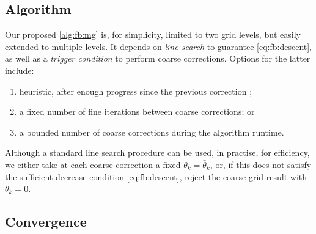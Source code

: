 \documentclass[a4paper,english]{jnsao}
\theoremstyle{definition}
\numberwithin{algorithm}{section}
\begin{document}
\subsection{Algorithm}
\label{sec:full-algorithm}

Our proposed \cref{alg:fb:mg} is, for simplicity, limited to two grid levels, but easily extended to multiple levels.
It depends on \emph{line search} to guarantee \eqref{eq:fb:descent}, as well as a \emph{trigger condition} to perform coarse corrections. Options for the latter include:
\begin{enumerate}[nosep]
    \item heuristic, after enough progress since the previous correction \cite{parpas2017multilevel};
    \item a fixed number of fine iterations between coarse corrections; or
    \item a bounded number of coarse corrections during the algorithm runtime.
\end{enumerate}
Although a standard line search procedure can be used, in practise, for efficiency, we either take at each coarse correction a fixed $\theta_{k} =\bar\theta_k$, or, if this does not satisfy the sufficient decrease condition  \eqref{eq:fb:descent}, reject the coarse grid result with $\theta_k=0$.

\subsection{Convergence}
\label{sec:convergence}
\end{document}
